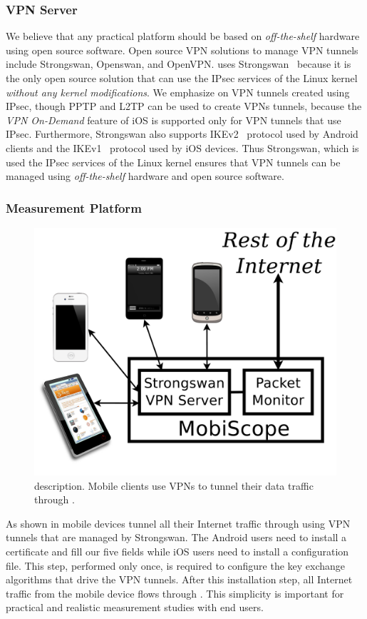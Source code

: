 \subsubsection{VPN Server}
We believe that any practical platform should be based on \emph{off-the-shelf} hardware using open source software. 
Open source VPN solutions to manage VPN tunnels include Strongswan, Openswan, and OpenVPN.
\platname uses Strongswan~\cite{strongswan} because it is the only open source solution that can use the IPsec services of the Linux kernel \emph{without any kernel modifications}.
We emphasize on VPN tunnels created using IPsec, though PPTP and L2TP can be used to create VPNs tunnels, because the \emph{VPN On-Demand} feature of iOS is supported only for VPN tunnels that use IPsec.
Furthermore, Strongswan also supports IKEv2~\cite{rfc5996} protocol used by Android clients and the IKEv1~\cite{rfc4109} protocol used by iOS devices. 
Thus Strongswan, which is used the IPsec services of the Linux kernel ensures that VPN tunnels can be managed using \emph{off-the-shelf} hardware and open source software.


\subsubsection{Measurement Platform}

\begin{figure}
\includegraphics[width=0.75\columnwidth]{figures/meddle-servers.pdf}
\caption{\platname description. Mobile clients use VPNs to tunnel their data traffic through \platname.}
\label{fig:description}
\end{figure}

As shown in  mobile devices tunnel all their Internet traffic through \platname using VPN tunnels that are managed by Strongswan. 
The Android users need to install a certificate and fill our five fields while iOS users need to install a configuration file. 
This step, performed only once, is required to configure the key exchange algorithms that drive the VPN tunnels. 
After this installation step, all Internet traffic from the mobile device flows through \platname. 
This simplicity is important for practical and realistic measurement studies with end users.


